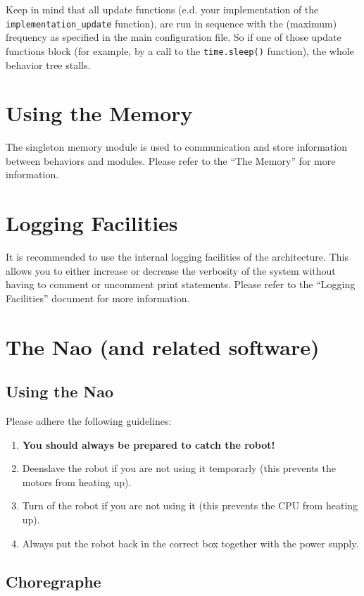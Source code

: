 \documentclass[a4paper, 10pt]{article}
\begin{document}
Keep in mind that all update functions (e.d. your implementation of the \lstinline{implementation_update} function), are run in sequence with the (maximum) frequency as specified in the main configuration file.
So if one of those update functions block (for example, by a call to the \lstinline{time.sleep()} function), the whole behavior tree stalls.

\section{Using the Memory}

The singleton memory module is used to communication and store information between behaviors and modules. 
Please refer to the ``The Memory'' for more information.

\section{Logging Facilities}

It is recommended to use the internal logging facilities of the architecture.
This allows you to either increase or decrease the verbosity of the system without having to comment or uncomment print statements.
Please refer to the ``Logging Facilities'' document for more information.

\section{The Nao (and related software)}
\label{sec:nao}

\subsection{Using the Nao}

Please adhere the following guidelines:
\begin{enumerate}
    \item \textbf{\large{You should always be prepared to catch the robot!}}
    \item Deenslave the robot if you are not using it temporarly (this prevents the motors from heating up).
    \item Turn of the robot if you are not using it (this prevents the CPU from heating up).
    \item Always put the robot back in the correct box together with the power supply.
\end{enumerate}

\subsection{Choregraphe}
\end{document}
